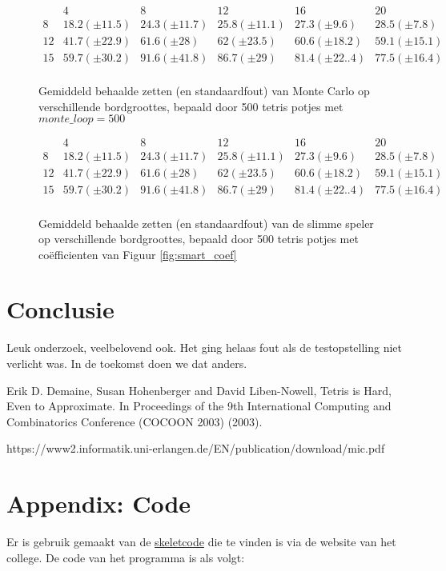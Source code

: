 \documentclass[10pt]{article}
\begin{document}
\begin{figure}
$$\begin{array}{l||c|c|c|c|c}
	    & 4 			& 8 			   & 12 			& 16 			 & 20 \\ 
	\hline\hline
	8  & 18.2 (\pm 11.5) 	& 24.3 (\pm 11.7) & 25.8 (\pm 11.1)  & 27.3 (\pm 9.6)  & 28.5 (\pm 7.8) \\
	12 & 41.7 (\pm 22.9) & 61.6 (\pm 28)    & 62 (\pm 23.5)     & 60.6 (\pm 18.2) & 59.1 (\pm 15.1)  \\
	15 & 59.7 (\pm 30.2) & 91.6 (\pm 41.8) & 86.7 (\pm 29)     & 81.4 (\pm 22..4) & 77.5 (\pm 16.4) \\
\end{array}$$
\caption{Gemiddeld behaalde zetten (en standaardfout) van Monte Carlo op verschillende bordgroottes, bepaald door 500 tetris potjes met $monte\_loop=500$}
\end{figure}

\begin{figure}
$$\begin{array}{l||c|c|c|c|c}
	    & 4 			& 8 			   & 12 			& 16 			 & 20 \\ 
	\hline\hline
	8  & 18.2 (\pm 11.5) 	& 24.3 (\pm 11.7) & 25.8 (\pm 11.1)  & 27.3 (\pm 9.6)  & 28.5 (\pm 7.8) \\
	12 & 41.7 (\pm 22.9) & 61.6 (\pm 28)    & 62 (\pm 23.5)     & 60.6 (\pm 18.2) & 59.1 (\pm 15.1)  \\
	15 & 59.7 (\pm 30.2) & 91.6 (\pm 41.8) & 86.7 (\pm 29)     & 81.4 (\pm 22..4) & 77.5 (\pm 16.4) \\
\end{array}$$
\caption{Gemiddeld behaalde zetten (en standaardfout) van de slimme speler op verschillende bordgroottes, bepaald door 500 tetris potjes met co\"efficienten van Figuur \ref{fig:smart_coef}}
\end{figure}

\section{Conclusie}

Leuk onderzoek, veelbelovend ook. Het ging helaas 
fout als de testopstelling niet verlicht was.
In de toekomst doen we dat anders.

\begin{thebibliography}{XX}

Erik D. Demaine, Susan Hohenberger and David Liben-Nowell, Tetris is
Hard, Even to Approximate. In Proceedings of the 9th International Computing and
Combinatorics Conference (COCOON 2003) (2003).

https://www2.informatik.uni-erlangen.de/EN/publication/download/mic.pdf

\end{thebibliography}

\section*{Appendix: Code}

Er is gebruik gemaakt van de \href{http://www.liacs.leidenuniv.nl/~kosterswa/AI/iets.cc}{\underline{skeletcode}} die te vinden is via
de website van het college.
De code van het programma is als volgt:

\smallskip
\end{document}
